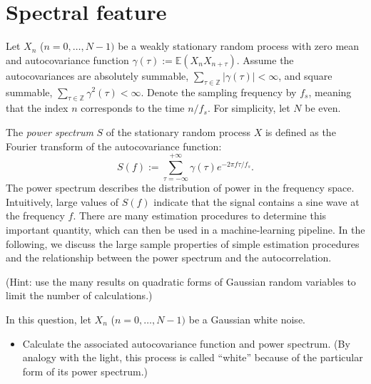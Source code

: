 \documentclass[11pt]{article}
\begin{document}
\section{Spectral feature}

Let $X_n$ ($n=0,\dots, N-1)$ be a weakly stationary random process with zero mean and autocovariance function $\gamma(\tau):= \mathbb{E}(X_n X_{n+\tau})$.
Assume the autocovariances are absolutely summable, \ie $\sum_{\tau\in\mathbb{Z}} |\gamma(\tau)| < \infty$, and square summable, \ie $\sum_{\tau\in\mathbb{Z}} \gamma^2(\tau) < \infty$.
Denote the sampling frequency by $f_s$, meaning that the index $n$ corresponds to the time $n / f_s$. For simplicity, let $N$ be even.


The \textit{power spectrum} $S$ of the stationary random process $X$ is defined as the Fourier transform of the autocovariance function:
\begin{equation}
    S(f) := \sum_{\tau=-\infty}^{+\infty}\gamma(\tau)e^{-2\pi f\tau/f_s}.
\end{equation}
The power spectrum describes the distribution of power in the frequency space. 
Intuitively, large values of $S(f)$ indicate that the signal contains a sine wave at the frequency $f$.
There are many estimation procedures to determine this important quantity, which can then be used in a machine-learning pipeline.
In the following, we discuss the large sample properties of simple estimation procedures and the relationship between the power spectrum and the autocorrelation.

(Hint: use the many results on quadratic forms of Gaussian random variables to limit the number of calculations.)

\begin{exercise}
In this question, let $X_n$ ($n=0,\dots,N-1)$ be a Gaussian white noise.

\begin{itemize}
    \item Calculate the associated autocovariance function and power spectrum. (By analogy with the light, this process is called ``white'' because of the particular form of its power spectrum.)
\end{itemize}

\end{exercise}
\end{document}
